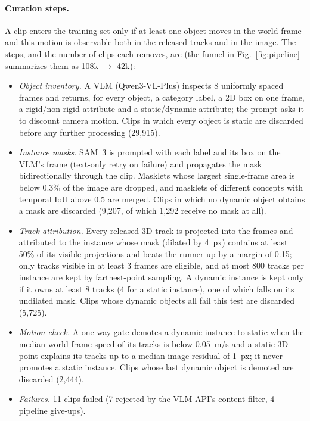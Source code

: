 \paragraph{Curation steps.}
A clip enters the training set only if at least one object moves in the world frame and this motion is observable both in the released tracks and in the image.
The steps, and the number of clips each removes, are (the funnel in Fig.~\ref{fig:pipeline} summarizes them as 108k $\rightarrow$ 42k):
\begin{itemize}
\item \emph{Object inventory.} A VLM (Qwen3-VL-Plus) inspects 8 uniformly spaced frames and returns, for every object, a category label, a 2D box on one frame, a rigid/non-rigid attribute and a static/dynamic attribute; the prompt asks it to discount camera motion. Clips in which every object is static are discarded before any further processing (29,915).
\item \emph{Instance masks.} SAM~3 is prompted with each label and its box on the VLM's frame (text-only retry on failure) and propagates the mask bidirectionally through the clip. Masklets whose largest single-frame area is below 0.3\% of the image are dropped, and masklets of different concepts with temporal IoU above 0.5 are merged. Clips in which no dynamic object obtains a mask are discarded (9,207, of which 1,292 receive no mask at all).
\item \emph{Track attribution.} Every released 3D track is projected into the frames and attributed to the instance whose mask (dilated by 4~px) contains at least 50\% of its visible projections and beats the runner-up by a margin of 0.15; only tracks visible in at least 3 frames are eligible, and at most 800 tracks per instance are kept by farthest-point sampling. A dynamic instance is kept only if it owns at least 8 tracks (4 for a static instance), one of which falls on its undilated mask. Clips whose dynamic objects all fail this test are discarded (5,725).
\item \emph{Motion check.} A one-way gate demotes a dynamic instance to static when the median world-frame speed of its tracks is below 0.05~m/s and a static 3D point explains its tracks up to a median image residual of 1~px; it never promotes a static instance. Clips whose last dynamic object is demoted are discarded (2,444).
\item \emph{Failures.} 11 clips failed (7 rejected by the VLM API's content filter, 4 pipeline give-ups).
\end{itemize}

